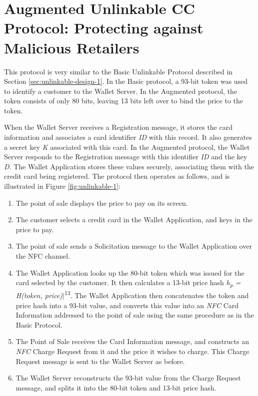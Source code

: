 \section{Augmented Unlinkable CC Protocol: Protecting against Malicious Retailers}
\label{sec:unlinkable-design-2}

This protocol is very similar to the Basic Unlinkable Protocol described in Section \ref{sec:unlinkable-design-1}.
In the Basic protocol, a 93-bit token was used to identify a customer to the Wallet Server.
In the Augmented protocol, the token consists of only 80 bits, leaving 13 bits left over to bind the price to the token.

When the Wallet Server receives a Registration message, it stores the card information and associates a card identifier \emph{ID} with this record.
It also generates a secret key \emph{K} associated with this card.
In the Augmented protocol, the Wallet Server responds to the Registration message with this identifier \emph{ID} and the key \emph{D}.
The Wallet Application stores these values securely, associating them with the credit card being registered.
The protocol then operates as follows, and is illustrated in Figure \ref{fig:unlinkable-1}:

\begin{enumerate}
    \item The point of sale displays the price to pay on its screen.
    \item The customer selects a credit card in the Wallet Application, and keys in the price to pay.
    \item The point of sale sends a Solicitation message to the Wallet Application over the NFC channel.
    \item The Wallet Application looks up the 80-bit token which was issued for the card selected by the customer.
        It then calculates a 13-bit price hash \emph{h\textsubscript{p} = H(token, price)}$|$\textsuperscript{13}.
        The Wallet Application then concatenates the token and price hash into a 93-bit value,
        and converts this value into an \emph{NFC} Card Information addressed to the point of sale using the same procedure as in the Basic Protocol.
    \item The Point of Sale receives the Card Information message, and constructs an \emph{NFC} Charge Request from it and the price it wishes to charge.
        This Charge Request message is sent to the Wallet Server as before.
    \item The Wallet Server reconstructs the 93-bit value from the Charge Request message, and splits it into the 80-bit token and 13-bit price hash.
\end{enumerate}